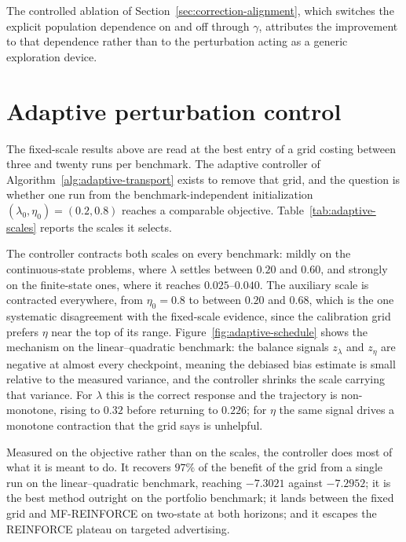 

The controlled ablation of Section~\ref{sec:correction-alignment}, which switches the explicit population dependence on and off through $\gamma$, attributes the improvement to that dependence rather than to the perturbation acting as a generic exploration device.

\section{Adaptive perturbation control}
\label{sec:adaptive-control}

The fixed-scale results above are read at the best entry of a grid costing between three and twenty runs per benchmark. The adaptive controller of Algorithm~\ref{alg:adaptive-transport} exists to remove that grid, and the question is whether one run from the benchmark-independent initialization $(\lambda_0,\eta_0)=(0.2,0.8)$ reaches a comparable objective. Table~\ref{tab:adaptive-scales} reports the scales it selects.



The controller contracts both scales on every benchmark: mildly on the continuous-state problems, where $\lambda$ settles between $0.20$ and $0.60$, and strongly on the finite-state ones, where it reaches $0.025$--$0.040$. The auxiliary scale is contracted everywhere, from $\eta_0=0.8$ to between $0.20$ and $0.68$, which is the one systematic disagreement with the fixed-scale evidence, since the calibration grid prefers $\eta$ near the top of its range. Figure~\ref{fig:adaptive-schedule} shows the mechanism on the linear--quadratic benchmark: the balance signals $z_\lambda$ and $z_\eta$ are negative at almost every checkpoint, meaning the debiased bias estimate is small relative to the measured variance, and the controller shrinks the scale carrying that variance. For $\lambda$ this is the correct response and the trajectory is non-monotone, rising to $0.32$ before returning to $0.226$; for $\eta$ the same signal drives a monotone contraction that the grid says is unhelpful.

Measured on the objective rather than on the scales, the controller does most of what it is meant to do. It recovers $97\%$ of the benefit of the grid from a single run on the linear--quadratic benchmark, reaching $-7.3021$ against $-7.2952$; it is the best method outright on the portfolio benchmark; it lands between the fixed grid and MF-REINFORCE on two-state at both horizons; and it escapes the REINFORCE plateau on targeted advertising.

